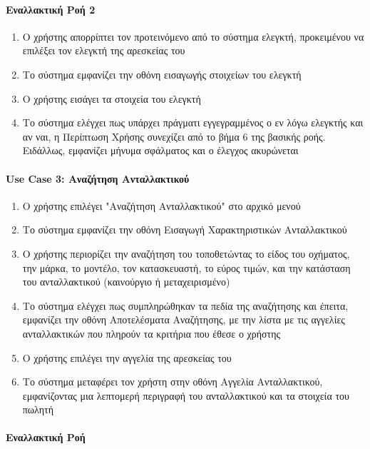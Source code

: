 \documentclass{../ol-softwaremanual}
\begin{document}
	\paragraph{Εναλλακτική Ροή 2}
	
	\begin{enumerate}
		\item Ο χρήστης απορρίπτει τον προτεινόμενο από το σύστημα ελεγκτή, προκειμένου να επιλέξει τον ελεγκτή της αρεσκείας του
		\item Το σύστημα εμφανίζει την οθόνη εισαγωγής στοιχείων του ελεγκτή
		\item Ο χρήστης εισάγει τα στοιχεία του ελεγκτή
		\item Το σύστημα ελέγχει πως υπάρχει πράγματι εγγεγραμμένος ο εν λόγω ελεγκτής και αν ναι, η Περίπτωση Χρήσης συνεχίζει από το βήμα 6 της βασικής ροής. Ειδάλλως, εμφανίζει μήνυμα σφάλματος και ο έλεγχος ακυρώνεται	
	\end{enumerate}	
	
	
	
	
	\paragraph{\en Use Case 3: \gr Αναζήτηση Ανταλλακτικού}	
	
	\begin{enumerate}
		\item Ο χρήστης επιλέγει \en"\gr Αναζήτηση Ανταλλακτικού\en" \gr στο αρχικό μενού
		\item Το σύστημα εμφανίζει την οθόνη Εισαγωγή Χαρακτηριστικών Ανταλλακτικού
		\item Ο χρήστης περιορίζει την αναζήτηση του τοποθετώντας το είδος του οχήματος, την μάρκα, το μοντέλο, τον κατασκευαστή, το εύρος τιμών, και την κατάσταση του ανταλλακτικού (καινούργιο ή μεταχειρισμένο) 
		\item Το σύστημα ελέγχει πως συμπληρώθηκαν τα πεδία της αναζήτησης και έπειτα, εμφανίζει την οθόνη Αποτελέσματα Αναζήτησης, με την λίστα με τις αγγελίες ανταλλακτικών που πληρούν τα κριτήρια που έθεσε ο χρήστης
		\item Ο χρήστης επιλέγει την αγγελία της αρεσκείας του
		\item Το σύστημα μεταφέρει τον χρήστη στην οθόνη Αγγελία Ανταλλακτικού, εμφανίζοντας μια λεπτομερή περιγραφή του ανταλλακτικού και τα στοιχεία του πωλητή		
	\end{enumerate}
	
	\paragraph{Εναλλακτική Ροή}
	
\end{document}
